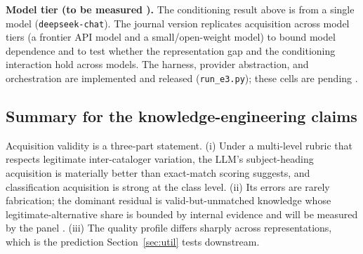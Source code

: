 \textbf{Model tier (to be measured ).} The conditioning result
above is from a single model (\texttt{deepseek-chat}). The journal version
replicates acquisition across model tiers (a frontier API model and a
small/open-weight model) to bound model dependence and to test whether the
representation gap and the conditioning interaction hold across models. The
harness, provider abstraction, and orchestration are implemented and
released (\texttt{run\_e3.py}); these cells are pending
.

\subsection{Summary for the knowledge-engineering claims}

Acquisition validity is a three-part statement. (i) Under a
multi-level rubric that respects legitimate inter-cataloger variation, the
LLM's subject-heading acquisition is materially better than exact-match
scoring suggests, and classification acquisition is strong at the class
level. (ii) Its errors are rarely fabrication; the dominant residual is
valid-but-unmatched knowledge whose legitimate-alternative share is bounded
by internal evidence and will be measured by the panel . (iii) The
quality profile differs sharply across representations, which is the
prediction Section~\ref{sec:util} tests downstream.
